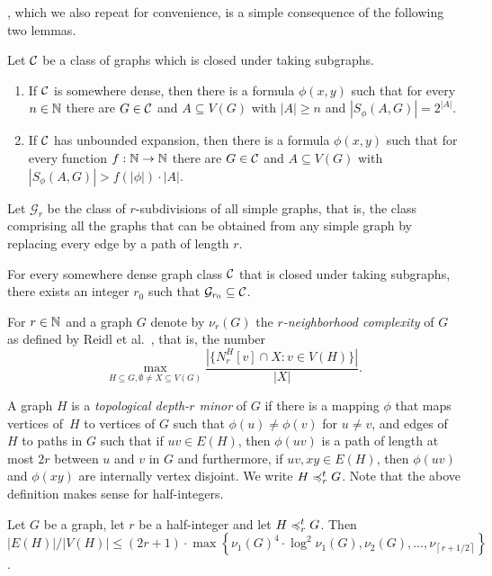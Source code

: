 , which we also repeat for
convenience, is a simple consequence of the following two
lemmas. 

\begin{theorem}
Let $\mathcal{C}$ be a class of graphs which 
is closed under taking subgraphs. 
\begin{enumerate}
\item If $\mathcal{C}$ is somewhere dense, then there is a formula 
$\phi(x,y)$ such that for every $n\in \mathbb{N}$ there are $G\in\mathcal{C}$ and $A\subseteq V(G)$ 
with $|A|\geq n$ and $|S_\phi(A,G)|=2^{|A|}$. 
\item If $\mathcal{C}$ has unbounded expansion, then there is a formula 
$\phi(x,y)$ such that for every function $f:\mathbb{N}\rightarrow \mathbb{N}$ 
there are $G\in\mathcal{C}$ and $A\subseteq V(G)$ 
with $|S_\phi(A,G)|>f(|\phi|)\cdot |A|$. 
\end{enumerate}
\end{theorem}

Let $\mathcal{G}_r$ be the class of $r$-subdivisions of all 
simple graphs, that is, the class comprising
all the graphs that can be obtained from any simple graph by replacing every edge by a path of
length $r$.

\begin{lemma}\label{lem:lower-nd}
For every somewhere dense graph class $\mathcal{C}$ that is closed 
under taking subgraphs, there
exists an integer $r_0$ such that $\mathcal{G}_{r_0}\subseteq \mathcal{C}$.
\end{lemma}

For $r\in \mathbb{N}$ and a graph $G$ denote by $\nu_r(G)$ the
\emph{$r$-neighborhood complexity} of $G$ as defined
by Reidl et al.~\cite{reidl2016characterising}, that is, the number 
\[\max_{H\subseteq G,\emptyset\neq X\subseteq V(G)}\frac{|\{N_r^H[v]\cap X : v\in V(H)\}|}{|X|}.\] 

A graph $H$ is a \emph{topological depth-$r$ minor} of $G$ if
there is a mapping $\phi$ that maps vertices of~$H$ to 
vertices of $G$ such that $\phi(u)\neq \phi(v)$ for 
$u\neq v$, and edges of $H$ to paths in 
$G$ such that if $uv\in E(H)$, then $\phi(uv)$
is a path of length at most $2r$ between $u$ and $v$ in 
$G$ and furthermore, if $uv, xy\in E(H)$, then 
$\phi(uv)$ and $\phi(xy)$ are internally vertex
disjoint. We write $H\preccurlyeq_r^t G$. 
Note that the above definition makes sense for 
half-integers. 

\begin{lemma}\label{lem:lower-be}
Let $G$ be a graph, let $r$ be a half-integer 
and let $H\preccurlyeq_r^tG$. 
Then $|E(H)|/|V(H)|\leq (2r + 1)\cdot \max \left\{\nu_1(G)^4\cdot \log^2\nu_1(G),\nu_2(G),\ldots, \nu_{\left\lceil r+1/2\right\rceil}\right\}$.
\end{lemma}

